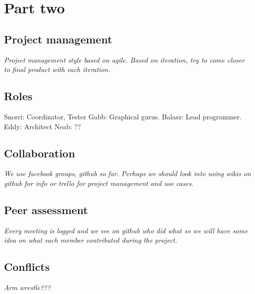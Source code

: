 \documentclass[11pt]{article}
\begin{document}
\section{Part two}
\subsection{Project management}
\textit{Project management style based on agile. Based on iteration, try to come closer to final product with each iteration.}
\subsection{Roles}
 Snorri: Coordinator, Tester Gabb: Graphical gurus. Balasz: Lead programmer. Eddy: Architect Neab: ??
\subsection{Collaboration}
\textit{We use facebook groups, github so far. Perhaps we should look into using wikis on github for info or trello for project management and use cases.}
\subsection{Peer assessment}
\textit{Every meeting is logged and we see on github who did what so we will have some idea on what each member contributed during the project. }
\subsection{Conflicts}
\textit{Arm wrestle???}

\end{document}
